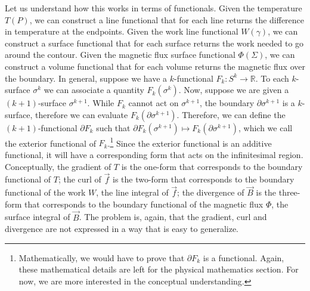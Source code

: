 Let us understand how this works in terms of functionals. Given the temperature $T(P)$, we can construct a line functional that for each line returns the difference in temperature at the endpoints. Given the work line functional $W(\gamma)$, we can construct a surface functional that for each surface returns the work needed to go around the contour. Given the magnetic flux surface functional $\Phi(\Sigma)$, we can construct a volume functional that for each volume returns the magnetic flux over the boundary. In general, suppose we have a $k$-functional $F_k : S^k \to \mathbb{R}$. To each $k$-surface $\sigma^k$ we can associate a quantity $F_k(\sigma^k)$. Now, suppose we are given a $(k+1)$-surface $\sigma^{k+1}$. While $F_k$ cannot act on $\sigma^{k+1}$, the boundary $\partial \sigma^{k+1}$ is a $k$-surface, therefore we can evaluate $F_k(\partial \sigma^{k+1})$. Therefore, we can define the $(k+1)$-functional $\partial F_k$ such that $\partial F_k (\sigma^{k+1}) \mapsto F_k(\partial \sigma^{k+1})$, which we call the exterior functional of $F_k$.\footnote{Mathematically, we would have to prove that $\partial F_k$ is a functional. Again, these mathematical details are left for the physical mathematics section. For now, we are more interested in the conceptual understanding.} Since the exterior functional is an additive functional, it will have a corresponding form that acts on the infinitesimal region. Conceptually, the gradient of $T$ is the one-form that corresponds to the boundary functional of $T$; the curl of $\vec{f}$ is the two-form that corresponds to the boundary functional of the work $W$, the line integral of $\vec{f}$; the divergence of $\vec{B}$ is the three-form that corresponds to the boundary functional of the magnetic flux $\Phi$, the surface integral of $\vec{B}$. The problem is, again, that the gradient, curl and divergence are not expressed in a way that is easy to generalize.

